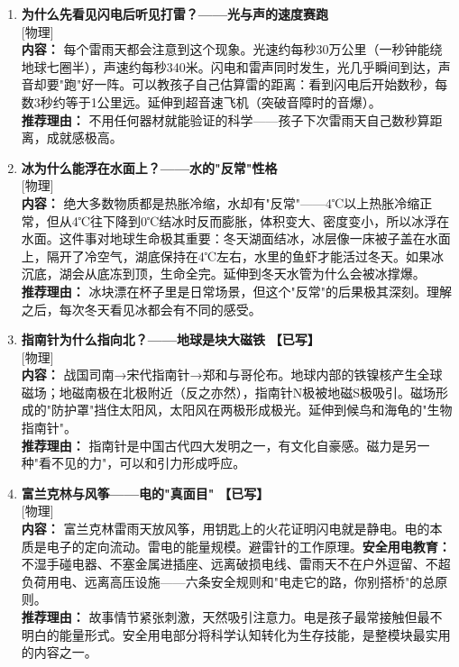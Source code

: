 \documentclass[a4paper,12pt]{ctexart}
\newcommand{\tagphysics}{\textcolor{physics}{\small [物理]}}
\newcommand{\done}{\textcolor{donegreen}{\textbf{【已写】}}}
\begin{document}
\begin{enumerate}
\item[\textbf{第20课}] \textbf{为什么先看见闪电后听见打雷？——光与声的速度赛跑} \\
\tagphysics \\
\textbf{内容：} 每个雷雨天都会注意到这个现象。光速约每秒30万公里（一秒钟能绕地球七圈半），声速约每秒340米。闪电和雷声同时发生，光几乎瞬间到达，声音却要"跑"好一阵。可以教孩子自己估算雷的距离：看到闪电后开始数秒，每数3秒约等于1公里远。延伸到超音速飞机（突破音障时的音爆）。\\
\textbf{推荐理由：} 不用任何器材就能验证的科学——孩子下次雷雨天自己数秒算距离，成就感极高。

\item[\textbf{第21课}] \textbf{冰为什么能浮在水面上？——水的"反常"性格} \\
\tagphysics \\
\textbf{内容：} 绝大多数物质都是热胀冷缩，水却有"反常"——4℃以上热胀冷缩正常，但从4℃往下降到0℃结冰时反而膨胀，体积变大、密度变小，所以冰浮在水面。这件事对地球生命极其重要：冬天湖面结冰，冰层像一床被子盖在水面上，隔开了冷空气，湖底保持在4℃左右，水里的鱼虾才能活过冬天。如果冰沉底，湖会从底冻到顶，生命全完。延伸到冬天水管为什么会被冰撑爆。\\
\textbf{推荐理由：} 冰块漂在杯子里是日常场景，但这个"反常"的后果极其深刻。理解之后，每次冬天看见冰都会有不同的感受。

\item[\textbf{第22课}] \textbf{指南针为什么指向北？——地球是块大磁铁} \done \\
\tagphysics \\
\textbf{内容：} 战国司南→宋代指南针→郑和与哥伦布。地球内部的铁镍核产生全球磁场；地磁南极在北极附近（反之亦然），指南针N极被地磁S极吸引。磁场形成的"防护罩"挡住太阳风，太阳风在两极形成极光。延伸到候鸟和海龟的"生物指南针"。\\
\textbf{推荐理由：} 指南针是中国古代四大发明之一，有文化自豪感。磁力是另一种"看不见的力"，可以和引力形成呼应。

\item[\textbf{第23课}] \textbf{富兰克林与风筝——电的"真面目"} \done \\
\tagphysics \\
\textbf{内容：} 富兰克林雷雨天放风筝，用钥匙上的火花证明闪电就是静电。电的本质是电子的定向流动。雷电的能量规模。避雷针的工作原理。\textbf{安全用电教育：}不湿手碰电器、不塞金属进插座、远离破损电线、雷雨天不在户外逗留、不超负荷用电、远离高压设施——六条安全规则和"电走它的路，你别搭桥"的总原则。\\
\textbf{推荐理由：} 故事情节紧张刺激，天然吸引注意力。电是孩子最常接触但最不明白的能量形式。安全用电部分将科学认知转化为生存技能，是整模块最实用的内容之一。

\end{enumerate}
\end{document}
